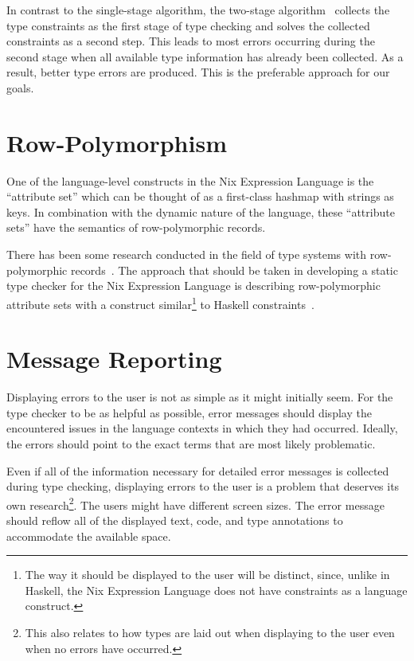 \documentclass[a4paper,conference]{IEEEtran}
\begin{document}
In contrast to the single-stage algorithm, the two-stage algorithm~\cite{jones2005practical,serrano2016type} collects the type constraints as the first stage of type checking and solves the collected constraints as a second step. This leads to most errors occurring during the second stage when all available type information has already been collected. As a result, better type errors are produced. This is the preferable approach for our goals.

\section{Row-Polymorphism}

One of the language-level constructs in the Nix Expression Language is the ``attribute set'' which can be thought of as a first-class hashmap with strings as keys. In combination with the dynamic nature of the language, these ``attribute sets'' have the semantics of row-polymorphic records.

There has been some research conducted in the field of type systems with row-polymorphic records~\cite{morris2019abstracting,leijen2005extensible}. The approach that should be taken in developing a static type checker for the Nix Expression Language is describing row-polymorphic attribute sets with a construct similar\footnote{The way it should be displayed to the user will be distinct, since, unlike in Haskell, the Nix Expression Language does not have constraints as a language construct.} to Haskell constraints~\cite{orchard2010haskell}.

\section{Message Reporting}

Displaying errors to the user is not as simple as it might initially seem. For the type checker to be as helpful as possible, error messages should display the encountered issues in the language contexts in which they had occurred. Ideally, the errors should point to the exact terms that are most likely problematic.

Even if all of the information necessary for detailed error messages is collected during type checking, displaying errors to the user is a problem that deserves its own research\footnote{This also relates to how types are laid out when displaying to the user even when no errors have occurred.}. The users might have different screen sizes. The error message should reflow all of the displayed text, code, and type annotations to accommodate the available space.
\end{document}
